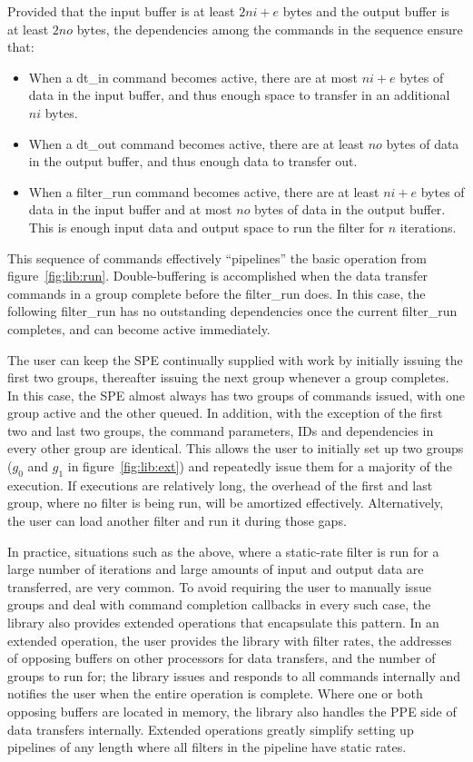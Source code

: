 Provided that the input buffer is at least $2ni+e$ bytes and the output buffer is at least $2no$ bytes, the dependencies among the commands in the sequence ensure that:
\begin{itemize}
\item When a \textsf{dt\_in} command becomes active, there are at most $ni+e$ bytes of data in the input buffer, and thus enough space to transfer in an additional $ni$ bytes.
\item When a \textsf{dt\_out} command becomes active, there are at least $no$ bytes of data in the output buffer, and thus enough data to transfer out.
\item When a \textsf{filter\_run} command becomes active, there are at least $ni+e$ bytes of data in the input buffer and at most $no$ bytes of data in the output buffer. This is enough input data and output space to run the filter for $n$ iterations.
\end{itemize}

This sequence of commands effectively ``pipelines'' the basic operation from figure~\ref{fig:lib:run}. Double-buffering is accomplished when the data transfer commands in a group complete before the \textsf{filter\_run} does. In this case, the following \textsf{filter\_run} has no outstanding dependencies once the current \textsf{filter\_run} completes, and can become active immediately.

The user can keep the SPE continually supplied with work by initially issuing the first two groups, thereafter issuing the next group whenever a group completes. In this case, the SPE almost always has two groups of commands issued, with one group active and the other queued. In addition, with the exception of the first two and last two groups, the command parameters, IDs and dependencies in every other group are identical. This allows the user to initially set up two groups ($g_0$ and $g_1$ in figure~\ref{fig:lib:ext}) and repeatedly issue them for a majority of the execution. If executions are relatively long, the overhead of the first and last group, where no filter is being run, will be amortized effectively. Alternatively, the user can load another filter and run it during those gaps.

In practice, situations such as the above, where a static-rate filter is run for a large number of iterations and large amounts of input and output data are transferred, are very common. To avoid requiring the user to manually issue groups and deal with command completion callbacks in every such case, the library also provides extended operations that encapsulate this pattern. In an extended operation, the user provides the library with filter rates, the addresses of opposing buffers on other processors for data transfers, and the number of groups to run for; the library issues and responds to all commands internally and notifies the user when the entire operation is complete. Where one or both opposing buffers are located in memory, the library also handles the PPE side of data transfers internally. Extended operations greatly simplify setting up pipelines of any length where all filters in the pipeline have static rates.

